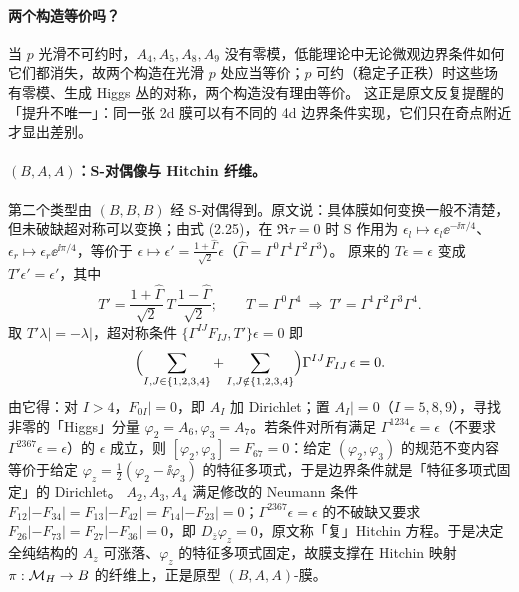 \paragraph{两个构造等价吗？}当 \(p\) 光滑不可约时，\(A_4,A_5,A_8,A_9\) 没有零模，低能理论中无论微观边界条件如何它们都消失，故两个构造在光滑 \(p\) 处应当等价；\(p\) 可约（稳定子正秩）时这些场有零模、生成 Higgs 丛的对称，两个构造没有理由等价。\pA{} 这正是原文反复提醒的「提升不唯一」：同一张 2d 膜可以有不同的 4d 边界条件实现，它们只在奇点附近才显出差别。\pA{}

\paragraph{\((B,A,A)\)：S-对偶像与 Hitchin 纤维。}第二个类型由 \((B,B,B)\) 经 S-对偶得到。原文说：具体膜如何变换一般不清楚，但未破缺超对称可以变换；由式 (2.25)，在 \(\Re\tau=0\) 时 S 作用为 \(\epsilon_l\mapsto\epsilon_l\ee^{-\ii\pi/4}\)、\(\epsilon_r\mapsto\epsilon_r\ee^{\ii\pi/4}\)，等价于 \(\epsilon\mapsto\epsilon'=\frac{1+\hat\Gamma}{\sqrt2}\epsilon\)（\(\hat\Gamma=\Gamma^0\Gamma^1\Gamma^2\Gamma^3\)）。\pA{} 原来的 \(T\epsilon=\epsilon\) 变成 \(T'\epsilon'=\epsilon'\)，其中
\begin{equation}
T'=\frac{1+\hat\Gamma}{\sqrt2}\,T\,\frac{1-\hat\Gamma}{\sqrt2};
\qquad T=\Gamma^0\Gamma^4\ \Longrightarrow\ T'=\Gamma^1\Gamma^2\Gamma^3\Gamma^4 .
\label{eq:Tprime}
\end{equation}
\pA{} 取 \(T'\lambda|=-\lambda|\)，超对称条件 \(\{\Gamma^{IJ}F_{IJ},T'\}\epsilon=0\) 即
\begin{equation}
\Bigl(\sum_{I,J\in\{1,2,3,4\}}+\sum_{I,J\notin\{1,2,3,4\}}\Bigr)\Gamma^{IJ}F_{IJ}\,\epsilon=0 .
\label{eq:BAA-cond}
\end{equation}
\pA{} 由它得：对 \(I>4\)，\(F_{0I}|=0\)，即 \(A_I\) 加 Dirichlet；置 \(A_I|=0\)（\(I=5,8,9\)），寻找非零的「Higgs」分量 \(\varphi_2=A_6,\varphi_3=A_7\)。若条件对所有满足 \(\Gamma^{1234}\epsilon=\epsilon\)（不要求 \(\Gamma^{2367}\epsilon=\epsilon\)）的 \(\epsilon\) 成立，则 \([\varphi_2,\varphi_3]=F_{67}=0\)：给定 \((\varphi_2,\varphi_3)\) 的规范不变内容等价于给定 \(\varphi_z=\frac12(\varphi_2-\ii\varphi_3)\) 的特征多项式，于是边界条件就是「特征多项式固定」的 Dirichlet。\pA{} \(A_2,A_3,A_4\) 满足修改的 Neumann 条件 \(F_{12}|-F_{34}|=F_{13}|-F_{42}|=F_{14}|-F_{23}|=0\)；\(\Gamma^{2367}\epsilon=\epsilon\) 的不破缺又要求 \(F_{26}|-F_{73}|=F_{27}|-F_{36}|=0\)，即 \(D_{\bar z}\varphi_z=0\)，原文称「复」Hitchin 方程。于是决定全纯结构的 \(A_z\) 可涨落、\(\varphi_z\) 的特征多项式固定，故膜支撑在 Hitchin 映射 \(\pi:\mathcal{M}_H\to B\) 的纤维上，正是原型 \((B,A,A)\)-膜。\pA{}

